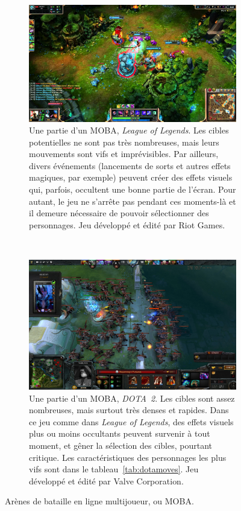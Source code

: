 	
	\begin{figure}[htb]
		\begin{subfigure}[t]{0.5\textwidth}
		\centering
		\includegraphics[width=\textwidth]{figures/ch1/lol}
		\caption[Une partie d'un MOBA, \emph{League of Legends}]{Une partie d'un MOBA, \emph{League of Legends}. Les cibles potentielles ne sont pas très nombreuses, mais leurs mouvements sont vifs et imprévisibles. Par ailleurs, divers événements (lancements de sorts et autres effets magiques, par exemple) peuvent créer des effets visuels qui, parfois, occultent une bonne partie de l'écran. Pour autant, le jeu ne s'arrête pas pendant ces moments-là et il demeure nécessaire de pouvoir sélectionner des personnages. Jeu développé et édité par Riot Games.}
		\label{fig:lol}
		\end{subfigure}
		~
		\begin{subfigure}[t]{0.5\textwidth}
		\centering
		\includegraphics[width=\textwidth]{figures/ch1/dota2}
		\caption[Une partie d'un MOBA, \emph{DOTA~2}]{Une partie d'un MOBA, \emph{DOTA~2}. Les cibles sont assez nombreuses, mais surtout très denses et rapides. Dans ce jeu comme dans \emph{League of Legends}, des effets visuels plus ou moins occultants peuvent survenir à tout moment, et gêner la sélection des cibles, pourtant critique. Les caractéristiques des personnages les plus vifs sont dans le tableau~\ref{tab:dotamoves}. Jeu développé et édité par Valve Corporation.}
		\label{fig:dota2}
		\end{subfigure}
		\label{fig:mobas}
		\caption{Arènes de bataille en ligne multijoueur, ou MOBA.}
	\end{figure}
	
